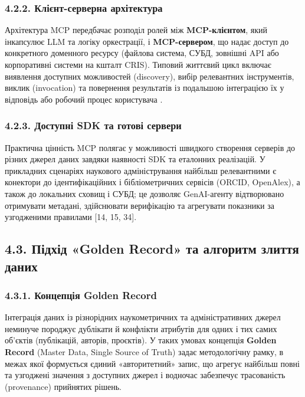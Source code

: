 \subsubsection*{4.2.2. Клієнт-серверна архітектура}

Архітектура MCP передбачає розподіл ролей між \textbf{MCP-клієнтом}, який інкапсулює LLM та логіку оркестрації, і \textbf{MCP-сервером}, що надає доступ до конкретного доменного ресурсу (файлова система, СУБД, зовнішні API або корпоративні системи на кшталт CRIS). Типовий життєвий цикл включає виявлення доступних можливостей (discovery), вибір релевантних інструментів, виклик (invocation) та повернення результатів із подальшою інтеграцією їх у відповідь або робочий процес користувача \cite{Anthropic2024MCP}.

\subsubsection*{4.2.3. Доступні SDK та готові сервери}

Практична цінність MCP полягає у можливості швидкого створення серверів до різних джерел даних завдяки наявності SDK та еталонних реалізацій. У прикладних сценаріях наукового адміністрування найбільш релевантними є конектори до ідентифікаційних і бібліометричних сервісів (ORCID, OpenAlex), а також до локальних сховищ і СУБД; це дозволяє GenAI-агенту відтворювано отримувати метадані, здійснювати верифікацію та агрегувати показники за узгодженими правилами [14, 15, 34].

\subsection*{4.3. Підхід «Golden Record» та алгоритм злиття даних}

\subsubsection*{4.3.1. Концепція Golden Record}

Інтеграція даних із різнорідних наукометричних та адміністративних джерел неминуче породжує дублікати й конфлікти атрибутів для одних і тих самих об'єктів (публікацій, авторів, проєктів). У таких умовах концепція \textbf{Golden Record} (Master Data, Single Source of Truth) задає методологічну рамку, в межах якої формується єдиний «авторитетний» запис, що агрегує найбільш повні та узгоджені значення з доступних джерел і водночас забезпечує трасованість (provenance) прийнятих рішень.

